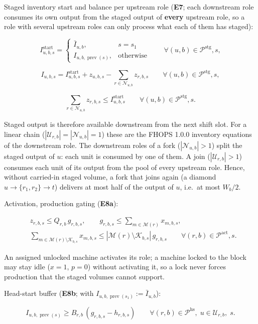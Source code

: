 Staged inventory start and balance per upstream role (\textbf{E7}; each
downstream role consumes its own output from the staged output of
\textbf{every} upstream role, so a role with several upstream roles can
only process what each of them has staged):

\[
I^{\text{start}}_{u,b,s}=
\begin{cases}
\bar{I}_{u,b}, & s = s_1\\
I_{u,b,\operatorname{prev}(s)}, & \text{otherwise}
\end{cases}
\qquad \forall (u,b)\in\mathcal{P}^{\text{stg}}, s,
\]

\[
I_{u,b,s}=I^{\text{start}}_{u,b,s}+z_{u,b,s}-\sum_{r\in\mathcal{N}_{u,b}} z_{r,b,s}
\qquad \forall (u,b)\in\mathcal{P}^{\text{stg}}, s,
\]

\[
\sum_{r\in\mathcal{N}_{u,b}} z_{r,b,s} \le I^{\text{start}}_{u,b,s}
\qquad \forall (u,b)\in\mathcal{P}^{\text{stg}}, s.
\]

Staged output is therefore available downstream from the next shift
slot. For a linear chain (\(|\mathcal{U}_{r,b}|=|\mathcal{N}_{u,b}|=1\))
these are the FHOPS 1.0.0 inventory equations of the downstream role.
The downstream roles of a fork (\(|\mathcal{N}_{u,b}|>1\)) split the
staged output of \(u\): each unit is consumed by one of them. A join
(\(|\mathcal{U}_{r,b}|>1\)) consumes each unit of its output from the
pool of every upstream role. Hence, without carried-in staged volume, a
fork that joins again (a diamond \(u\to\{r_1,r_2\}\to t\)) delivers at
most half of the output of \(u\), i.e.~at most \(W_b/2\).

Activation, production gating (\textbf{E8a}):

\[
\begin{aligned}
&z_{r,b,s} \le Q_{r,b}\,g_{r,b,s},
\qquad
g_{r,b,s} \le \sum_{m\in\mathcal{M}(r)} x_{m,b,s},\\
&\sum_{m\in\mathcal{M}(r)\setminus\mathcal{K}_{b,s}} x_{m,b,s} \le |\mathcal{M}(r)\setminus\mathcal{K}_{b,s}|\, g_{r,b,s}
\qquad \forall (r,b)\in\mathcal{P}^{\text{act}}, s.
\end{aligned}
\]

An assigned unlocked machine activates its role; a machine locked to the
block may stay idle (\(x=1\), \(p=0\)) without activating it, so a lock
never forces production that the staged volumes cannot support.

Head-start buffer (\textbf{E8b}; with
\(I_{u,b,\operatorname{prev}(s_1)} := \bar{I}_{u,b}\)):

\[
I_{u,b,\operatorname{prev}(s)} \ge B_{r,b}\,\left(g_{r,b,s}-h_{r,b,s}\right)
\qquad \forall (r,b)\in\mathcal{P}^{\text{hs}},\; u\in\mathcal{U}_{r,b},\; s.
\]

